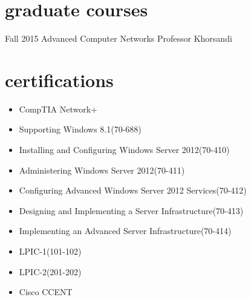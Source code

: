 \documentclass[]{friggeri-cv} %
\begin{document}

\section{graduate courses}

\begin{entrylist}

	\entry
	{Fall 2015}
	{Advanced Computer Networks}
	{Professor Khorsandi}
	{}


\end{entrylist}


\section{certifications}
\begin{itemize}
	\item CompTIA Network+
	\item Supporting Windows 8.1(70-688)
	\item Installing and Configuring Windows Server 2012(70-410)
	\item Administering Windows Server 2012(70-411)
	\item Configuring Advanced Windows Server 2012 Services(70-412)
	\item Designing and Implementing a Server Infrastructure(70-413)
	\item Implementing an Advanced Server Infrastructure(70-414)
	\item LPIC-1(101-102)
	\item LPIC-2(201-202)
	\item Cisco CCENT
\end{itemize}
\end{document}
